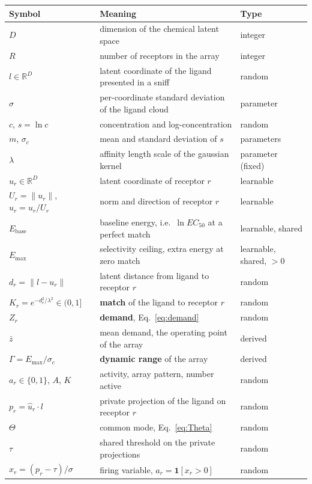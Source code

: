 \documentclass[11pt,a4paper]{article}
\newcommand{\RR}{\mathbb{R}}
\newcommand{\Ebase}{E_{\mathrm{base}}}
\newcommand{\Emax}{E_{\mathrm{max}}}
\newcommand{\uhat}{\hat{u}}
\begin{document}
\begin{center}
\begin{tabular}{lll}
\toprule
Symbol & Meaning & Type \\
\midrule
$D$ & dimension of the chemical latent space & integer \\
$R$ & number of receptors in the array & integer \\
$l \in \RR^D$ & latent coordinate of the ligand presented in a sniff & random \\
$\sigma$ & per-coordinate standard deviation of the ligand cloud & parameter \\
$c$, $s = \ln c$ & concentration and log-concentration & random \\
$m$, $\sigma_c$ & mean and standard deviation of $s$ & parameters \\
$\lambda$ & affinity length scale of the gaussian kernel & parameter (fixed) \\
$u_r \in \RR^D$ & latent coordinate of receptor $r$ & learnable \\
$U_r = \|u_r\|$, $\uhat_r = u_r/U_r$ & norm and direction of receptor $r$ & learnable \\
$\Ebase$ & baseline energy, i.e.\ $\ln EC_{50}$ at a perfect match & learnable, shared \\
$\Emax$ & selectivity ceiling, extra energy at zero match & learnable, shared, $>0$ \\
$d_r = \|l - u_r\|$ & latent distance from ligand to receptor $r$ & random \\
$K_r = e^{-d_r^2/\lambda^2} \in (0,1]$ & \textbf{match} of the ligand to receptor $r$ & random \\
$Z_r$ & \textbf{demand}, Eq.~\eqref{eq:demand} & random \\
$\bar{z}$ & mean demand, the operating point of the array & derived \\
$\Gamma = \Emax/\sigma_c$ & \textbf{dynamic range} of the array & derived \\
$a_r \in \{0,1\}$, $A$, $K$ & activity, array pattern, number active & random \\
$p_r = \uhat_r\cdot l$ & private projection of the ligand on receptor $r$ & random \\
$\Theta$ & common mode, Eq.~\eqref{eq:Theta} & random \\
$\tau$ & shared threshold on the private projections & random \\
$x_r=(p_r-\tau)/\sigma$ & firing variable, $a_r=\mathbf 1[x_r>0]$ & random \\

\end{tabular}
\end{center}
\end{document}
